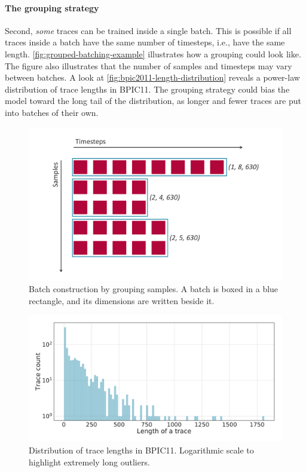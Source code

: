 \paragraph{The grouping strategy}
Second, \textit{some} traces can be trained inside a single batch.
This is possible if all traces inside a batch have the same number of timesteps, i.e., have the same length.
\autoref{fig:grouped-batching-example} illustrates how a grouping could look like.
The figure also illustrates that the number of samples and timesteps may vary between batches.
A look at \autoref{fig:bpic2011-length-distribution} reveals a power-law distribution of trace lengths in BPIC11.
The grouping strategy could bias the model toward the long tail of the distribution, as longer and fewer traces are put into batches of their own.

\begin{figure}[!htb]
    \centering
    \includegraphics[width=\textwidth]{gfx/grouped-batching.pdf}
    \caption[Grouping strategy for batches]{Batch construction by grouping samples. A batch is boxed in a blue rectangle, and its dimensions are written beside it.}
    \label{fig:grouped-batching-example}
\end{figure}

\begin{figure}[!htb]
    \centering
    \includegraphics[width=\textwidth]{gfx/bpic11-length-frequency.pdf}
    \caption[Distribution of trace lengths in BPIC11]{Distribution of trace lengths in BPIC11. Logarithmic scale to highlight extremely long outliers.}
    \label{fig:bpic2011-length-distribution}
\end{figure}

